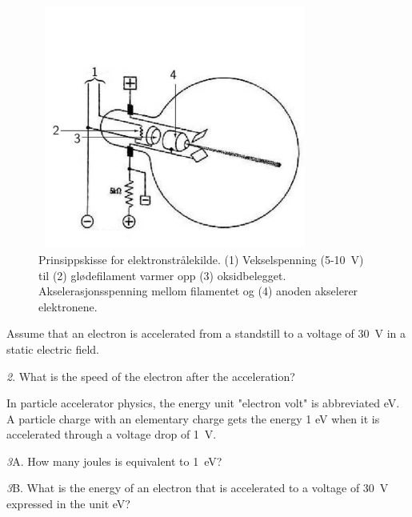 \documentclass[../Elmag-labhefte-2020.tex]{subfiles}
\begin{document}
\begin{figure}[!h]
\RawFloats
    \vspace{-2cm}
    \centering
    \includegraphics[width=9cm,height=8cm,keepaspectratio]{fig/LorentzFig1_resized.pdf}
    \caption{%
        Prinsippskisse for elektronstrålekilde. 
        (1) Vekselspenning (5-\SI{10}{\volt}) til 
        (2) glødefilament varmer opp 
        (3) oksidbelegget. 
        Akselerasjonsspenning mellom filamentet og 
        (4) anoden akselerer elektronene.
    }
    \label{lorentz.fig1}
\end{figure}

Assume that an electron is accelerated from a standstill to a voltage of \SI{30}{\volt} in a static electric field.

{\emph 2. What is the speed of the electron after the acceleration? }

In particle accelerator physics, the energy unit "electron volt" is abbreviated \si{\eV}. A particle charge with an elementary charge gets the energy 1 eV when it is accelerated through a voltage drop of \SI{1}{\volt}.

{\emph 3A. How many joules is equivalent to \SI{1}{\eV}? }

{\emph 3B. What is the energy of an electron that is accelerated to a voltage of \SI{30}{\volt} expressed in the unit \si{\eV}?}
 
\end{document}
